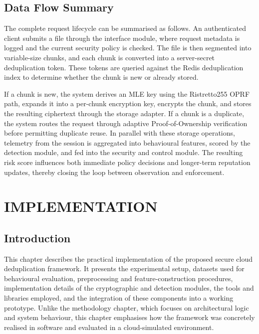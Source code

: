 \documentclass[12pt,a4paper,oneside]{report}
\begin{document}
\section{Data Flow Summary}

The complete request lifecycle can be summarised as follows.
An authenticated client submits a file through the interface module, where request metadata is logged and the current security policy is checked.
The file is then segmented into variable-size chunks, and each chunk is converted into a server-secret deduplication token.
These tokens are queried against the Redis deduplication index to determine whether the chunk is new or already stored.

If a chunk is new, the system derives an MLE key using the Ristretto255 OPRF path, expands it into a per-chunk encryption key, encrypts the chunk, and stores the resulting ciphertext through the storage adapter.
If a chunk is a duplicate, the system routes the request through adaptive Proof-of-Ownership verification before permitting duplicate reuse.
In parallel with these storage operations, telemetry from the session is aggregated into behavioural features, scored by the detection module, and fed into the security and control module.
The resulting risk score influences both immediate policy decisions and longer-term reputation updates, thereby closing the loop between observation and enforcement.

\chapter{IMPLEMENTATION}

\section{Introduction}

This chapter describes the practical implementation of the proposed secure cloud deduplication framework. It presents the experimental setup, datasets used for behavioural evaluation, preprocessing and feature-construction procedures, implementation details of the cryptographic and detection modules, the tools and libraries employed, and the integration of these components into a working prototype. Unlike the methodology chapter, which focuses on architectural logic and system behaviour, this chapter emphasises how the framework was concretely realised in software and evaluated in a cloud-simulated environment.
\end{document}

